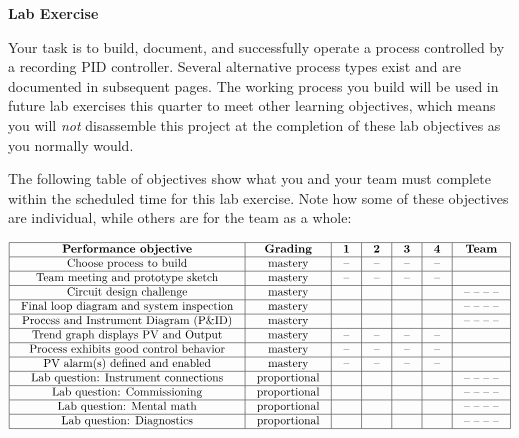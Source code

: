 

\noindent
{\bf Lab Exercise}

\vskip 5pt

Your task is to build, document, and successfully operate a process controlled by a recording PID controller.  Several alternative process types exist and are documented in subsequent pages.  The working process you build will be used in future lab exercises this quarter to meet other learning objectives, which means you will {\it not} disassemble this project at the completion of these lab objectives as you normally would.

The following table of objectives show what you and your team must complete within the scheduled time for this lab exercise.  Note how some of these objectives are individual, while others are for the team as a whole:



$$\vbox{\offinterlineskip
\halign{\strut
\vrule \quad\hfil # \ \hfil & 
\vrule \quad\hfil # \ \hfil & 
\vrule \quad\hfil # \ \hfil & 
\vrule \quad\hfil # \ \hfil & 
\vrule \quad\hfil # \ \hfil & 
\vrule \quad\hfil # \ \hfil & 
\vrule \quad\hfil # \ \hfil \vrule \cr
\noalign{\hrule}
%
{\bf Performance objective} & {\bf Grading} & {\bf 1} & {\bf 2} & {\bf 3} & {\bf 4} & {\bf Team} \cr
%
\noalign{\hrule}
%
Choose process to build & mastery & -- & -- & -- & -- & \cr
%
\noalign{\hrule}
%
Team meeting and prototype sketch & mastery & -- & -- & -- & -- & \cr
%
\noalign{\hrule}
%
Circuit design challenge & mastery & & & & & -- -- -- -- \cr
%
\noalign{\hrule}
%
Final loop diagram and system inspection & mastery & & & & & -- -- -- -- \cr
%
\noalign{\hrule}
%
Process and Instrument Diagram (P\&ID) & mastery & & & & & -- -- -- -- \cr
%
\noalign{\hrule}
%
Trend graph displays PV and Output & mastery & -- & -- & -- & -- &  \cr
%
\noalign{\hrule}
%
Process exhibits good control behavior & mastery & -- & -- & -- & -- &  \cr
%
\noalign{\hrule}
%
PV alarm(s) defined and enabled & mastery & -- & -- & -- & -- &  \cr
%
\noalign{\hrule}
%
Lab question: Instrument connections & proportional &  &  &  &  & -- -- -- -- \cr
%
\noalign{\hrule}
%
Lab question: Commissioning & proportional &  &  &  &  & -- -- -- -- \cr
%
\noalign{\hrule}
%
Lab question: Mental math & proportional &  &  &  &  & -- -- -- -- \cr
%
\noalign{\hrule}
%
Lab question: Diagnostics & proportional &  &  &  &  & -- -- -- -- \cr
%
\noalign{\hrule}
} %
}$$ %

